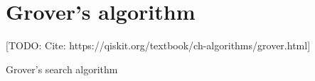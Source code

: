 \chapter{Grover's algorithm}

[TODO: Cite: https://qiskit.org/textbook/ch-algorithms/grover.html]

Grover's search algorithm 
